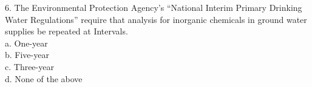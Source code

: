 6.	The Environmental Protection Agency’s “National Interim Primary Drinking Water Regulations” require that analysis for inorganic chemicals in ground water supplies be repeated at Intervals.\\

a.	One-year\\
b.	Five-year\\
c.	Three-year\\
d.	None of the above\\




















































